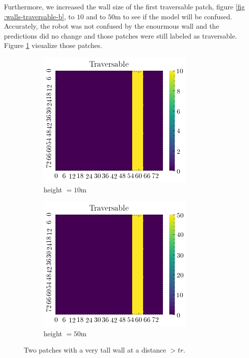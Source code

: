 \documentclass[../document.tex]{subfiles}
\begin{document}
Furthermore, we increased the wall size of the first traversable patch, figure \ref{fig :walls-traversable-b}, to $10$ and to $50$m to see if the model will be confused. Accurately, the robot was not confused by the enourmous wall and the predictions did no change and those patches were still labeled as traversable. Figure \ref{fig : walls-tall} visualize those patches.
\begin{figure} [htbp]
    \centering
    \begin{subfigure}[b]{0.33\textwidth}
        \includegraphics[width=\linewidth]{../img/5/custom_patches/walls_front/big-1-2d.png}
    \caption{height $=10$m}
    \end{subfigure}   
    \begin{subfigure}[b]{0.33\textwidth}
        \includegraphics[width=\linewidth]{../img/5/custom_patches/walls_front/big-2-2d.png}
        \caption{height $=50$m}
    \end{subfigure}   
\caption{Two patches with a very tall wall at a distance $> tr$.}    
\label{fig : walls-tall}
\end{figure}
\end{document}
